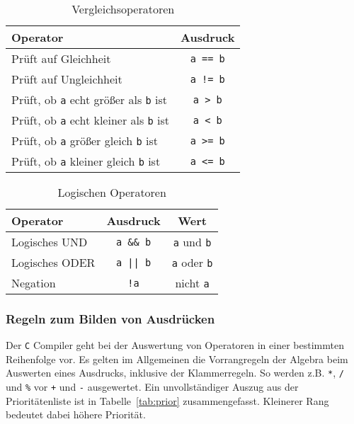 \begin{table}
  \centering
  \begin{tabular}{l c}
    \hline
    Operator & Ausdruck \\
    \hline
    Prüft auf Gleichheit & \verb|a == b|  \\
    Prüft auf Ungleichheit & \verb|a != b| \\
    Prüft, ob \verb|a| echt größer als \verb|b| ist & \verb|a > b| \\
    Prüft, ob \verb|a| echt kleiner als \verb|b| ist & \verb|a < b| \\
    Prüft, ob \verb|a| größer gleich \verb|b| ist & \verb|a >= b| \\
    Prüft, ob \verb|a| kleiner gleich \verb|b| ist & \verb|a <= b| \\
    \hline
  \end{tabular}
  \caption{Vergleichsoperatoren \label{vergoper}}
\end{table}

\begin{table}
  \centering
  \begin{tabular}{l c c}
    \hline
    Operator & Ausdruck & Wert \\
    \hline
    Logisches UND & \verb|a && b|  &   \verb|a| und \verb|b| \\

    Logisches ODER & \verb'a || b'  &   \verb|a| oder \verb|b| \\

    Negation      & \verb|!a|      &   nicht \verb|a| \\
    \hline
  \end{tabular}
  \caption{Logischen Operatoren \label{vergoper2}}
\end{table}

\subsubsection{Regeln zum Bilden von Ausdrücken}

Der \texttt{C} Compiler geht bei der Auswertung von Operatoren in einer bestimmten Reihenfolge vor.
Es gelten im Allgemeinen die Vorrangregeln der Algebra beim Auswerten eines Ausdrucks, inklusive der Klammerregeln.
So werden z.B. \verb|*|, \verb|/| und \verb|%| vor \verb|+| und \verb|-| ausgewertet.
Ein unvollständiger Auszug aus der Prioritätenliste ist in Tabelle~\ref{tab:prior} zusammengefasst.
Kleinerer Rang bedeutet dabei höhere Priorität.

